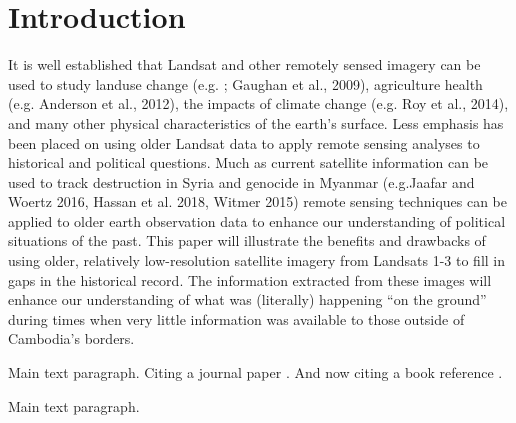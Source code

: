 \section{Introduction}
It is well established that Landsat and other remotely sensed imagery can be used to study landuse change (e.g. \cite{Seto et al.,2002-}; Gaughan et al., 2009), agriculture health (e.g. Anderson et al., 2012), the impacts of climate change (e.g. Roy et al., 2014), and many other physical characteristics of the earth's surface.  
Less emphasis has been placed on using older Landsat data to apply remote sensing analyses to historical and political questions. Much as current satellite information can be used to track destruction in Syria and genocide in Myanmar (e.g.Jaafar and Woertz 2016, Hassan et al. 2018, Witmer 2015) remote sensing techniques can be applied to older earth observation data to enhance our understanding of political situations of the past.  This paper will illustrate the benefits and drawbacks of using older, relatively low-resolution satellite imagery from Landsats 1-3 to fill in gaps in the historical record.
The information extracted from these images will enhance our understanding of what was (literally) happening “on the ground” during times when very little information was available to those outside of Cambodia’s borders.


Main text paragraph. Citing a journal paper \cite{ref-journal}. And now citing a book reference \cite{ref-book}.


Main text paragraph.
